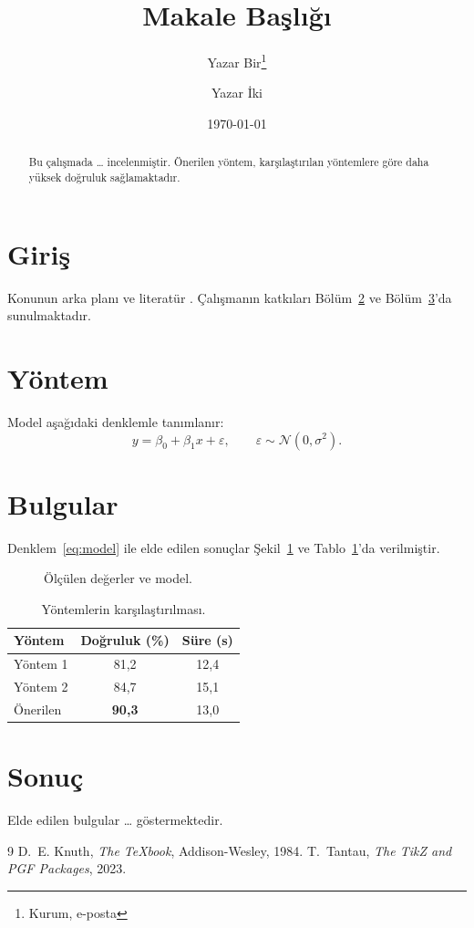 \documentclass[11pt,a4paper]{article}
\title{Makale Başlığı}
\author{Yazar Bir\thanks{Kurum, e-posta} \and Yazar İki}
\date{\today}
\begin{document}
\maketitle

\begin{abstract}
Bu çalışmada \ldots{} incelenmiştir. Önerilen yöntem, karşılaştırılan
yöntemlere göre daha yüksek doğruluk sağlamaktadır.
\end{abstract}

\section{Giriş}
Konunun arka planı ve literatür \cite{knuth1984}. Çalışmanın katkıları
Bölüm~\ref{sec:yontem} ve Bölüm~\ref{sec:bulgular}'da sunulmaktadır.

\section{Yöntem}\label{sec:yontem}
Model aşağıdaki denklemle tanımlanır:
\begin{equation}\label{eq:model}
  y = \beta_0 + \beta_1 x + \varepsilon, \qquad \varepsilon \sim \mathcal{N}(0,\sigma^2).
\end{equation}

\section{Bulgular}\label{sec:bulgular}
Denklem~\eqref{eq:model} ile elde edilen sonuçlar Şekil~\ref{fig:sonuc}
ve Tablo~\ref{tab:sonuc}'da verilmiştir.

\begin{figure}[ht]
  \centering
  
  \caption{Ölçülen değerler ve model.}
  \label{fig:sonuc}
\end{figure}

\begin{table}[ht]
  \centering
  \caption{Yöntemlerin karşılaştırılması.}
  \label{tab:sonuc}
  \begin{tabular}{lcc}
    \toprule
    Yöntem & Doğruluk (\%) & Süre (s) \\
    \midrule
    Yöntem 1 & 81{,}2 & 12{,}4 \\
    Yöntem 2 & 84{,}7 & 15{,}1 \\
    Önerilen & \textbf{90{,}3} & 13{,}0 \\
    \bottomrule
  \end{tabular}
\end{table}

\section{Sonuç}
Elde edilen bulgular \ldots{} göstermektedir.

\begin{thebibliography}{9}
   D.~E. Knuth, \emph{The \TeX book}, Addison-Wesley, 1984.
   T.~Tantau, \emph{The TikZ and PGF Packages}, 2023.
\end{thebibliography}
\end{document}
